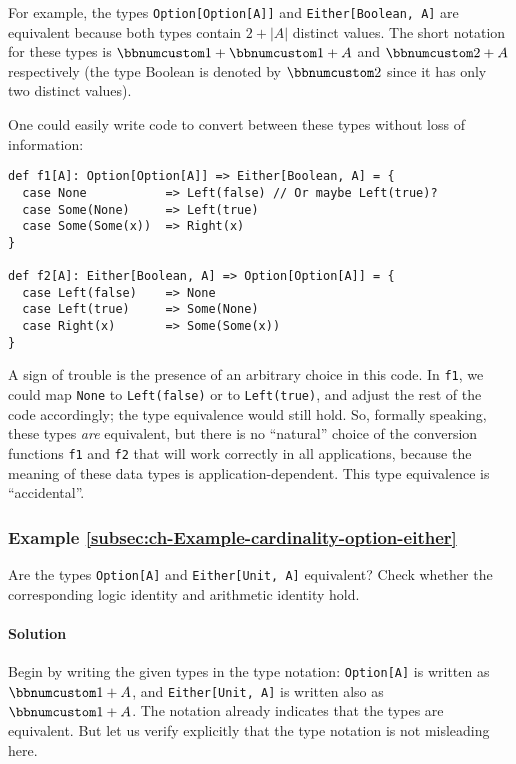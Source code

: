 For example, the types \lstinline!Option[Option[A]]! and \lstinline!Either[Boolean, A]!
are equivalent because both types contain $2+\left|A\right|$ distinct
values. The short notation for these types is $\bbnum 1+\bbnum 1+A$
and $\bbnum 2+A$ respectively (the type Boolean is denoted by $\bbnum 2$
since it has only two distinct values). 

One could easily write code to convert between these types without
loss of information:
\begin{lstlisting}
def f1[A]: Option[Option[A]] => Either[Boolean, A] = {
  case None           => Left(false) // Or maybe Left(true)?
  case Some(None)     => Left(true)
  case Some(Some(x))  => Right(x)
}

def f2[A]: Either[Boolean, A] => Option[Option[A]] = {
  case Left(false)    => None
  case Left(true)     => Some(None)
  case Right(x)       => Some(Some(x))
}
\end{lstlisting}
A sign of trouble is the presence of an arbitrary choice in this code.
In \lstinline!f1!, we could map \lstinline!None! to \lstinline!Left(false)!
or to \lstinline!Left(true)!, and adjust the rest of the code accordingly;
the type equivalence would still hold. So, formally speaking, these
types \emph{are} equivalent, but there is no ``natural'' choice
of the conversion functions \lstinline!f1! and \lstinline!f2! that
will work correctly in all applications, because the meaning of these
data types is application-dependent. This type equivalence is ``accidental''.

\subsubsection{Example \label{subsec:ch-Example-cardinality-option-either}\ref{subsec:ch-Example-cardinality-option-either}}

Are the types \lstinline!Option[A]! and \lstinline!Either[Unit, A]!
equivalent? Check whether the corresponding logic identity and arithmetic
identity hold.

\paragraph{Solution}

Begin by writing the given types in the type notation: \lstinline!Option[A]!
is written as $\bbnum 1+A$, and \lstinline!Either[Unit, A]! is written
also as $\bbnum 1+A$. The notation already indicates that the types
are equivalent. But let us verify explicitly that the type notation
is not misleading here.

